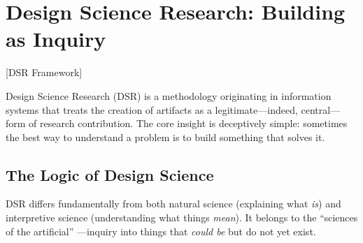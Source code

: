\documentclass[../main.tex]{subfiles}
\begin{document}
\section{Design Science Research: Building as Inquiry}[DSR Framework]

Design Science Research (DSR) is a methodology originating in information systems that treats the creation of artifacts as a legitimate---indeed, central---form of research contribution. The core insight is deceptively simple: sometimes the best way to understand a problem is to build something that solves it.

\subsection{The Logic of Design Science}

DSR differs fundamentally from both natural science (explaining what \emph{is}) and interpretive science (understanding what things \emph{mean}). It belongs to the ``sciences of the artificial'' \cite{simon1996sciences}---inquiry into things that \emph{could be} but do not yet exist.
\end{document}
